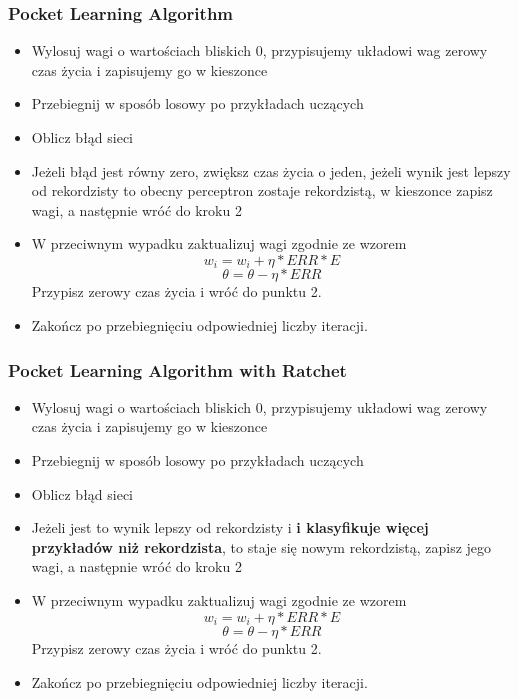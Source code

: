 \documentclass[16pt]{beamer}
\begin{document}
\begin{frame}
\frametitle{Pocket Learning Algorithm}
\begin{itemize}
  \item Wylosuj wagi o wartościach bliskich 0,
  przypisujemy układowi wag zerowy czas życia i zapisujemy go w kieszonce
  \item Przebiegnij w sposób losowy po przykładach uczących
  \item Oblicz błąd sieci
  \item Jeżeli błąd jest równy zero, zwiększ czas życia o jeden, jeżeli wynik jest lepszy od rekordzisty to obecny perceptron zostaje rekordzistą, w kieszonce zapisz wagi, a następnie wróć do kroku 2
  \item W przeciwnym wypadku zaktualizuj wagi zgodnie ze wzorem
  \[
  w_i = w_i + \eta * ERR * E
  \]
  \[
  \theta = \theta - \eta * ERR
  \]
  Przypisz zerowy czas życia i wróć do punktu 2.
  \item Zakończ po przebiegnięciu odpowiedniej liczby iteracji.
\end{itemize}
\end{frame}

\begin{frame}
\frametitle{Pocket Learning Algorithm with Ratchet}
\begin{itemize}
  \item Wylosuj wagi o wartościach bliskich 0,
  przypisujemy układowi wag zerowy czas życia i zapisujemy go w kieszonce
  \item Przebiegnij w sposób losowy po przykładach uczących
  \item Oblicz błąd sieci
  \item Jeżeli jest to wynik lepszy od rekordzisty i \textbf{i klasyfikuje więcej przykładów niż rekordzista}, to staje się nowym rekordzistą, zapisz jego wagi, a następnie wróć do kroku 2
  \item W przeciwnym wypadku zaktualizuj wagi zgodnie ze wzorem
  \[
  w_i = w_i + \eta * ERR * E
  \]
  \[
  \theta = \theta - \eta * ERR
  \]
  Przypisz zerowy czas życia i wróć do punktu 2.
  \item Zakończ po przebiegnięciu odpowiedniej liczby iteracji.
\end{itemize}
\end{frame}
\end{document}
